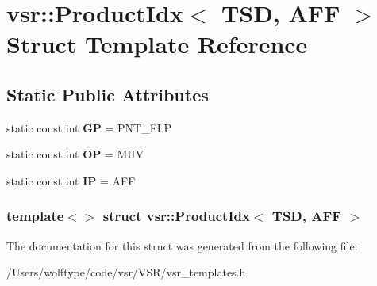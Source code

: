 \hypertarget{structvsr_1_1_product_idx_3_01_t_s_d_00_01_a_f_f_01_4}{\section{vsr\-:\-:Product\-Idx$<$ T\-S\-D, A\-F\-F $>$ Struct Template Reference}
\label{structvsr_1_1_product_idx_3_01_t_s_d_00_01_a_f_f_01_4}
}
\subsection*{Static Public Attributes}
\begin{DoxyCompactItemize}
\item 
\hypertarget{structvsr_1_1_product_idx_3_01_t_s_d_00_01_a_f_f_01_4_afd3d229cc588e4f37dc4d9e9a2f25e96}{static const int {\bfseries G\-P} = P\-N\-T\-\_\-\-F\-L\-P}\label{structvsr_1_1_product_idx_3_01_t_s_d_00_01_a_f_f_01_4_afd3d229cc588e4f37dc4d9e9a2f25e96}

\item 
\hypertarget{structvsr_1_1_product_idx_3_01_t_s_d_00_01_a_f_f_01_4_a8535f842c24265d756817175ee1d0533}{static const int {\bfseries O\-P} = M\-U\-V}\label{structvsr_1_1_product_idx_3_01_t_s_d_00_01_a_f_f_01_4_a8535f842c24265d756817175ee1d0533}

\item 
\hypertarget{structvsr_1_1_product_idx_3_01_t_s_d_00_01_a_f_f_01_4_a7a53c9a85e05e639b97d992ad8f11ccd}{static const int {\bfseries I\-P} = A\-F\-F}\label{structvsr_1_1_product_idx_3_01_t_s_d_00_01_a_f_f_01_4_a7a53c9a85e05e639b97d992ad8f11ccd}

\end{DoxyCompactItemize}
\subsubsection*{template$<$$>$ struct vsr\-::\-Product\-Idx$<$ T\-S\-D, A\-F\-F $>$}



The documentation for this struct was generated from the following file\-:\begin{DoxyCompactItemize}
\item 
/\-Users/wolftype/code/vsr/\-V\-S\-R/vsr\-\_\-templates.\-h\end{DoxyCompactItemize}
